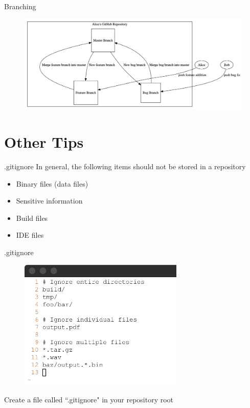 \documentclass{beamer}
\begin{document}
    \begin{frame}{Branching}
        \begin{figure}
            \centering
            \includegraphics[width=\textwidth]{figures/branch.png}
        \end{figure}
    \end{frame}

    \section{Other Tips}\label{sec:other-tips}
    \begin{frame}{.gitignore}
        In general, the following items should not be stored in a repository
        \begin{itemize}
            \item Binary files (data files)
            \item Sensitive information
            \item Build files
            \item IDE files
        \end{itemize}
    \end{frame}

    \begin{frame}{.gitignore}
        \begin{figure}
            \centering
            \includegraphics[width=0.7\textwidth]{figures/gitignore.png}
        \end{figure}
        \centering
        Create a file called ``.gitignore" in your repository root
    \end{frame}
\end{document}
